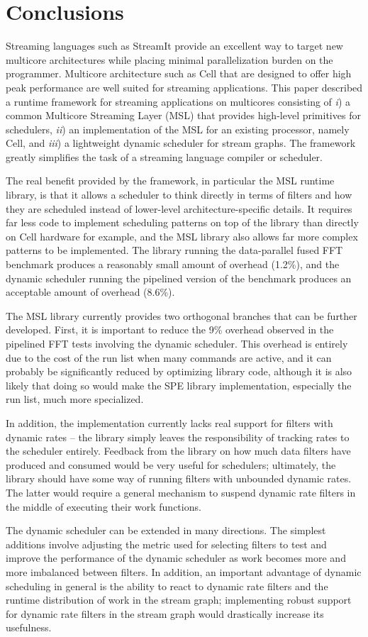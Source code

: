 \section{Conclusions}\label{ch:conc}

Streaming languages such as StreamIt provide an excellent way to
target new multicore architectures while placing minimal
parallelization burden on the programmer. Multicore architecture such
as Cell that are designed to offer high peak performance are well
suited for streaming applications. This paper described a runtime
framework for streaming applications on multicores consisting of
\emph{i}) a common Multicore Streaming Layer (MSL) that provides
high-level primitives for schedulers,  \emph{ii}) an implementation
of the MSL for an existing processor, namely Cell, and \emph{iii}) a
lightweight dynamic scheduler for stream graphs. The framework greatly
simplifies the task of a streaming language compiler or scheduler.

The real benefit provided by the framework, in particular the MSL
runtime library, is that it allows a scheduler to think directly in
terms of filters and how they are scheduled instead of lower-level
architecture-specific details. It requires far less code to implement
scheduling patterns on top of the library than directly on Cell
hardware for example, and the MSL library also allows far more complex
patterns to be implemented. The library running the data-parallel
fused FFT benchmark produces a reasonably small amount of overhead
(1.2\%), and the dynamic scheduler running the pipelined version of
the benchmark produces an acceptable amount of overhead (8.6\%).

The MSL library currently provides two orthogonal branches that can be
further developed. First, it is important to reduce the 9\% overhead
observed in the pipelined FFT tests involving the dynamic
scheduler. This overhead is entirely due to the cost of the run list
when many commands are active, and it can probably be significantly
reduced by optimizing library code, although it is also likely that
doing so would make the SPE library implementation, especially the run
list, much more specialized.

In addition, the implementation currently lacks real support for
filters with dynamic rates -- the library simply leaves the
responsibility of tracking rates to the scheduler entirely. Feedback
from the library on how much data filters have produced and consumed
would be very useful for schedulers; ultimately, the library should
have some way of running filters with unbounded dynamic rates. The
latter would require a general mechanism to suspend dynamic rate
filters in the middle of executing their work functions.

The dynamic scheduler can be extended in many directions. The simplest
additions involve adjusting the metric used for selecting filters to
test and improve the performance of the dynamic scheduler as work
becomes more and more imbalanced between filters. In addition, an
important advantage of dynamic scheduling in general is the ability to
react to dynamic rate filters and the runtime distribution of work in
the stream graph; implementing robust support for dynamic rate filters
in the stream graph would drastically increase its usefulness.
